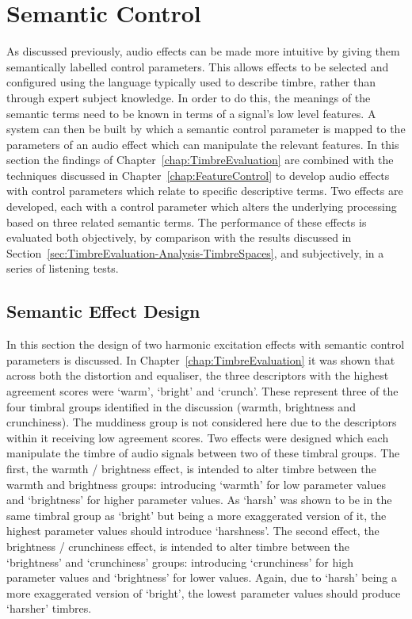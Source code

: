 \section{Semantic Control}
\label{sec:PerceptualExperiments-SemanticControl}
	As discussed previously, audio effects can be made more intuitive by giving them semantically labelled control
	parameters. This allows effects to be selected and configured using the language typically used to describe timbre,
	rather than through expert subject knowledge. In order to do this, the meanings of the semantic terms need to be
	known in terms of a signal's low level features. A system can then be built by which a semantic control parameter
	is mapped to the parameters of an audio effect which can manipulate the relevant features. In this section the
	findings of Chapter~\ref{chap:TimbreEvaluation} are combined with the techniques discussed in
	Chapter~\ref{chap:FeatureControl} to develop audio effects with control parameters which relate to specific
	descriptive terms. Two effects are developed, each with a control parameter which alters the underlying processing
	based on three related semantic terms. The performance of these effects is evaluated both objectively, by
	comparison with the results discussed in Section~\ref{sec:TimbreEvaluation-Analysis-TimbreSpaces}, and
	subjectively, in a series of listening tests.

	\subsection{Semantic Effect Design}
	\label{sec:PerceptualExperiments-SemanticControl-EffectDesign}
		In this section the design of two harmonic excitation effects with semantic control parameters is
		discussed. In Chapter~\ref{chap:TimbreEvaluation} it was shown that across both the distortion and
		equaliser, the three descriptors with the highest agreement scores were `warm', `bright' and `crunch'.
		These represent three of the four timbral groups identified in the discussion (warmth, brightness and
		crunchiness). The muddiness group is not considered here due to the descriptors within it receiving low
		agreement scores. Two effects were designed which each manipulate the timbre of audio signals between two
		of these timbral groups. The first, the warmth / brightness effect, is intended to alter timbre between the
		warmth and brightness groups: introducing `warmth' for low parameter values and `brightness' for higher
		parameter values. As `harsh' was shown to be in the same timbral group as `bright' but being a more
		exaggerated version of it, the highest parameter values should introduce `harshness'. The second effect,
		the brightness / crunchiness effect, is intended to alter timbre between the `brightness' and `crunchiness'
		groups: introducing `crunchiness' for high parameter values and `brightness' for lower values. Again, due
		to `harsh' being a more exaggerated version of `bright', the lowest parameter values should produce
		`harsher' timbres.

